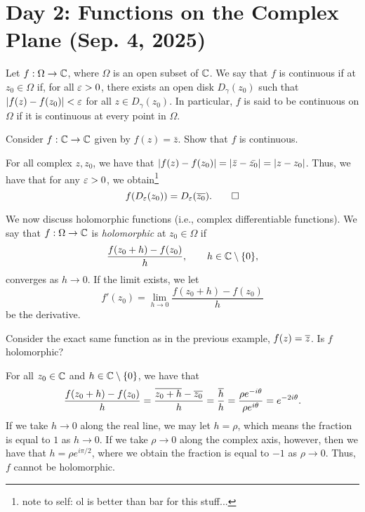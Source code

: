 \section{Day 2: Functions on the Complex Plane (Sep. 4, 2025)}
Let $f : \Omega \to \mathbb C$, where $\Omega$ is an open subset of $\mathbb C$. We say that $f$ is continuous if at $z_0 \in \Omega$ if, for all $\varepsilon > 0$, there exists an open disk $D_\gamma(z_0)$ such that $\left\lvert f(z) - f(z_0) \right\rvert < \varepsilon$ for all $z \in D_\gamma(z_0)$. In particular, $f$ is said to be continuous on $\Omega$ if it is continuous at every point in $\Omega$.
\begin{example}
    Consider $f : \mathbb C \to \mathbb C$ given by $f(z) = \bar{z}$. Show that $f$ is continuous.
\end{example}
\begin{solution}
    For all complex $z, z_0$, we have that $\left\lvert f(z) - f(z_0) \right\rvert = \left\lvert \bar{z} - \bar{z_0} \right\rvert = \left\lvert z - z_0 \right\rvert$. Thus, we have that for any $\varepsilon > 0$, we obtain\footnote{note to self: ol is better than bar for this stuff...}
    \[ f(D_\varepsilon(z_0)) = D_\varepsilon(\overline{z_0}). \qedhere \]
\end{solution}
\noindent We now discuss holomorphic functions (i.e., complex differentiable functions). We say that $f : \Omega \to \mathbb C$ is \textit{holomorphic} at $z_0 \in \Omega$ if
\[ \frac{f(z_0 + h) - f(z_0)}{h}, \qquad h \in \mathbb C \setminus \{0\}, \]
converges as $h \to 0$. If the limit exists, we let
\[ f'(z_0) = \lim_{h \to 0} \frac{f(z_0 + h) - f(z_0)}{h} \]
be the derivative.
\begin{example}
    Consider the exact same function as in the previous example, $f(z) = \overline{z}$. Is $f$ holomorphic?
\end{example}
\begin{solution}
    For all $z_0 \in \mathbb C$ and $h \in \mathbb C \setminus \{0\}$, we have that
    \[ \frac{f(z_0 + h) - f(z_0)}{h} = \frac{\overline{z_0 + h} - \overline{z_0}}{h} = \frac{\overline{h}}{h} = \frac{\rho e^{-i \theta}}{\rho e^{i\theta}} = e^{-2 i \theta}. \]
    If we take $h \to 0$ along the real line, we may let $h = \rho$, which means the fraction is equal to $1$ as $h \to 0$. If we take $\rho \to 0$ along the complex axis, however, then we have that $h = \rho e^{i \pi/2}$, where we obtain the fraction is equal to $-1$ as $\rho \to 0$. Thus, $f$ cannot be holomorphic.
\end{solution}
